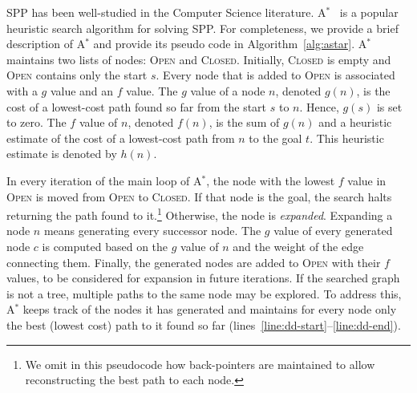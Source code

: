 \documentclass[smallextended]{svjour3}       %
\newcommand{\astar}{A$^*$\xspace}
\newcommand{\open}{\textsc{Open}\xspace}
\newcommand{\closed}{\textsc{Closed}\xspace}
\newcommand{\roni}[1]{\textbf{[RS:#1]}}
\begin{document}
SPP has been well-studied in the Computer Science literature.
\astar~\cite{hartNR68Astar} is a popular heuristic search algorithm for solving SPP.
For completeness, we provide a brief description of \astar and provide its pseudo code in Algorithm~\ref{alg:astar}.
\astar maintains two lists of nodes: \open and \closed.
Initially, \closed is empty and \open contains only the start $s$.
Every node that is added to \open is associated with a $g$ value 
and an $f$ value.
The $g$ value of a node $n$, denoted $g(n)$, is the cost of a lowest-cost path found so far from the start $s$ to $n$.
Hence, $g(s)$ is set to zero.
The $f$ value of $n$, denoted $f(n)$, is the sum of $g(n)$ and a heuristic estimate of the cost of a lowest-cost path from $n$ to the goal $t$.
This heuristic estimate is denoted by $h(n)$. %


In every iteration of the main loop of \astar, the node with the lowest $f$ value in \open is moved from \open to \closed.
If that node is the goal, the search halts returning the path found to it.\footnote{We omit in this pseudocode how back-pointers are maintained to  allow reconstructing the best path to each node.}
Otherwise, the node is \emph{expanded}. 
Expanding a node $n$ means generating every successor node. 
The $g$ value of every generated node $c$ is computed based on the $g$ value of $n$ and the weight of the edge connecting them. Finally, the generated nodes are added to \open with their $f$ values, to be considered for expansion in future iterations.
If the searched graph is not a tree, multiple paths to the same node may be explored.
To address this, \astar keeps track of the nodes it has generated and maintains for every node only the best (lowest cost) path to it found so far (lines~\ref{line:dd-start}--\ref{line:dd-end}).


\end{document}
